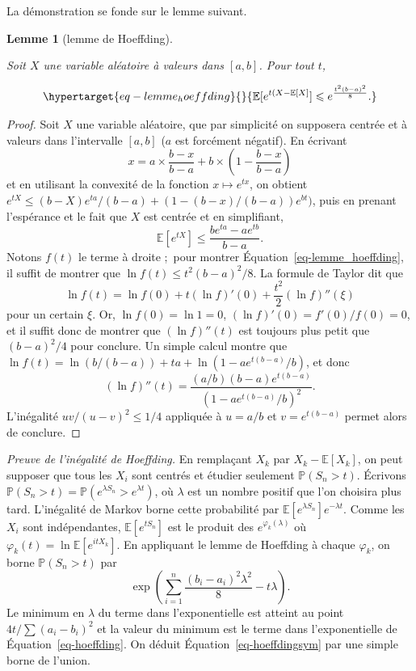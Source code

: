 \documentclass[
  10,
  letterpaper,
  DIV=11,
  numbers=noendperiod]{scrreport}
\theoremstyle{plain}
\theoremstyle{definition}
\theoremstyle{plain}
\theoremstyle{definition}
\theoremstyle{definition}
\theoremstyle{plain}
\newtheorem{lemma}{Lemme}[chapter]
\theoremstyle{remark}
\begin{document}
La démonstration se fonde sur le lemme suivant.

\begin{lemma}[lemme de
Hoeffding]\protect\hypertarget{lem-hoeffding}{}\label{lem-hoeffding}

Soit \(X\) une variable aléatoire à valeurs dans \([a,b]\). Pour tout
\(t\),

\begin{equation}\protect\hypertarget{eq-lemme_hoeffding}{}{\mathbb{E}[e^{t(X-\mathbb{E}[X]}] \leqslant e^{\frac{t^2(b-a)^2}{8}}.}\label{eq-lemme_hoeffding}\end{equation}

\end{lemma}

\begin{proof}

Soit \(X\) une variable aléatoire, que par simplicité on supposera
centrée et à valeurs dans l'intervalle \([a,b]\) (\(a\) est forcément
négatif). En écrivant
\[x = a\times \frac{b-x}{b-a} + b\times \left(1 - \frac{b-x}{b-a}\right)\]
et en utilisant la convexité de la fonction \(x \mapsto e^{tx}\), on
obtient
\(e^{tX}\leqslant (b-X)e^{ta}/(b-a) + (1 - (b-x)/(b-a)) e^{bt})\), puis
en prenant l'espérance et le fait que \(X\) est centrée et en
simplifiant,
\[\mathbb{E}[e^{tX}]\leqslant \frac{be^{ta} - ae^{tb}}{b-a}.\] Notons
\(f(t)\) le terme à droite ;~pour montrer
Équation~\ref{eq-lemme_hoeffding}, il suffit de montrer que
\(\ln f(t) \leqslant t^2(b-a)^2/8\). La formule de Taylor dit que
\[ \ln f(t) = \ln f(0) + t (\ln f)'(0) + \frac{t^2}{2}(\ln f)''(\xi)\]
pour un certain \(\xi\). Or, \(\ln f(0) = \ln 1 = 0\),
\((\ln f)'(0) = f'(0)/f(0) = 0\), et il suffit donc de montrer que
\((\ln f)''(t)\) est toujours plus petit que \((b-a)^2/4\) pour
conclure. Un simple calcul montre que
\(\ln f(t) = \ln(b/(b-a)) + ta + \ln(1 - ae^{t(b-a)} / b)\), et donc
\[ (\ln f)''(t) = \frac{(a/b)(b-a)e^{t(b-a)}}{(1 - ae^{t(b-a)}/b)^2}.\]
L'inégalité \(uv/(u-v)^2 \leqslant 1/4\) appliquée à \(u = a/b\) et
\(v = e^{t(b-a)}\) permet alors de conclure.

\end{proof}

\emph{Preuve de l'inégalité de Hoeffding.} En remplaçant \(X_k\) par
\(X_k - \mathbb{E}[X_k]\), on peut supposer que tous les \(X_i\) sont
centrés et étudier seulement \(\mathbb{P}(S_n >t)\). Écrivons
\(\mathbb{P}(S_n > t) = \mathbb{P}(e^{\lambda S_n} > e^{\lambda t})\),
où \(\lambda\) est un nombre positif que l'on choisira plus tard.
L'inégalité de Markov borne cette probabilité par
\(\mathbb{E}[e^{\lambda S_n}]e^{-\lambda t}\). Comme les \(X_i\) sont
indépendantes, \(\mathbb{E}[e^{tS_n}]\) est le produit des
\(e^{ \varphi_k(\lambda)}\) où
\(\varphi_k(t) = \ln \mathbb{E}[e^{itX_k}]\). En appliquant le lemme de
Hoeffding à chaque \(\varphi_k\), on borne \(\mathbb{P}(S_n >t)\) par
\[ \exp\left(\sum_{i=1}^n \frac{(b_i - a_i)^2 \lambda^2}{8} - t\lambda\right).\]
Le minimum en \(\lambda\) du terme dans l'exponentielle est atteint au
point \(4t / \sum (a_i - b_i)^2\) et la valeur du minimum est le terme
dans l'exponentielle de Équation~\ref{eq-hoeffding}. On déduit
Équation~\ref{eq-hoeffdingsym} par une simple borne de l'union.
\end{document}
